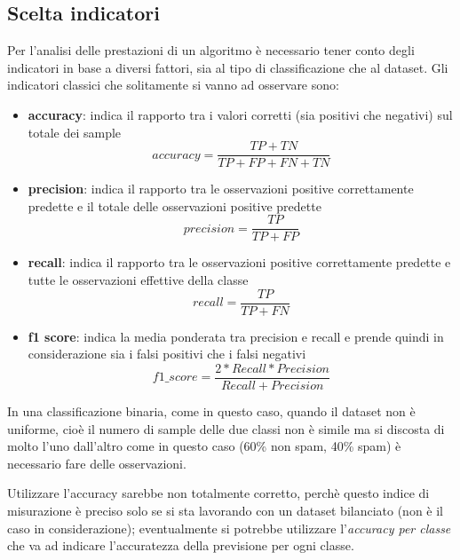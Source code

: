 \documentclass[12pt,a4paper]{article}
\begin{document}
\subsection{Scelta indicatori}
Per l'analisi delle prestazioni di un algoritmo è necessario tener conto degli indicatori in base a diversi fattori, sia al tipo di classificazione che al dataset. 
Gli indicatori classici che solitamente si vanno ad osservare sono:
\begin{itemize}
    \item \textbf{accuracy}: indica il rapporto tra i valori corretti (sia positivi che negativi) sul totale dei sample 
    \begin{equation}
         accuracy = \frac{ TP+TN}{TP+FP+FN+TN}
    \end{equation}
    
    \item \textbf{precision}: indica il rapporto tra le osservazioni positive correttamente predette e il totale delle osservazioni positive predette
    \begin{equation}
         precision = \frac{ TP}{TP+FP}
    \end{equation}
    
    \item \textbf{recall}: indica il rapporto tra le osservazioni positive correttamente predette e tutte le osservazioni effettive della classe
    \begin{equation}
         recall = \frac{TP}{TP+FN}
    \end{equation}
    
    \item \textbf{f1 score}: indica la media ponderata tra precision e recall e prende quindi in considerazione sia i falsi positivi che i falsi negativi
    \begin{equation}
         f1\_score = \frac{2*Recall * Precision}{Recall + Precision}
    \end{equation}
\end{itemize}
In una classificazione binaria, come in questo caso, quando il dataset non è uniforme, cioè il numero di sample delle due classi non è simile ma si discosta di molto l'uno dall'altro come in questo caso (60\% non spam, 40\% spam) è necessario fare delle osservazioni. 

Utilizzare l'accuracy sarebbe non totalmente corretto, perchè questo indice di misurazione è preciso solo se si sta lavorando con un dataset bilanciato (non è il caso in considerazione);
eventualmente si potrebbe utilizzare l'\textit{accuracy per classe} che va ad indicare l'accuratezza della previsione per ogni classe.
\end{document}

